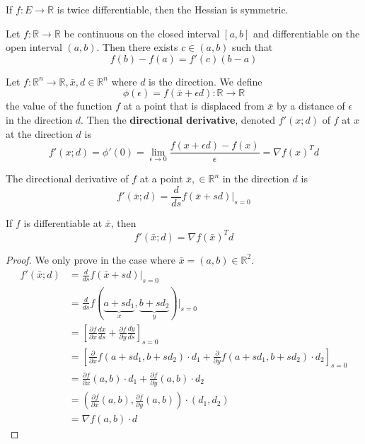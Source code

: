 \begin{theorem}[]
  If $f: E \to \mathbb R$ is twice differentiable, then the Hessian is symmetric.
\end{theorem}
\begin{theorem}
  Let $f: \mathbb R \to \mathbb R$ be continuous on the closed interval $[a,b]$ and differentiable on the open interval $(a,b)$. Then there exists $c \in (a,b)$ such that
  $$f(b) - f(a) = f'(c) (b - a)$$
\end{theorem}
\begin{lemma}
  Let $f: \mathbb R^n \rightarrow \mathbb R, \bar x, d \in \mathbb R^n$ where $d$ is the direction. We define
  $$\phi (\epsilon) = f(\bar x + \epsilon d): \mathbb R \rightarrow \mathbb R$$ the value of the function $f$ at a point that is displaced from $\bar x$ by a distance of $\epsilon$ in the direction $d$.
  Then the \textbf{directional derivative}, denoted $f'(x; d)$ of $f$ at $x$ at the direction $d$ is
  $$f'(x; d) = \phi'(0) = \lim_{\epsilon \rightarrow 0} \frac{f(x + \epsilon d) - f(x)}{\epsilon} = \nabla f(x)^T d$$
\end{lemma}
\begin{definition}
  The directional derivative of $f$ at a point $\bar x, \in \mathbb R^n$ in the direction $d$ is $$f'(\bar x; d) = \frac{d}{ds} f(\bar x + sd) \bigg|_{s = 0}$$
\end{definition}
\begin{theorem}[]
  If $f$ is differentiable at $\bar x$, then $$f'(\bar x; d) = \nabla f(\bar x)^T d$$
\end{theorem}
\begin{proof}[Proof]
  We only prove in the case where $\bar x = (a, b) \in \mathbb R^2$.
  \begin{align*}
      f'(\bar x; d) &= \frac{d}{ds} f(\bar x + sd) \bigg|_{s = 0} \\
      &= \frac{d}{ds} f(\underbrace{a + sd_1}_{x}, \underbrace{b + sd_2}_{y}) \bigg|_{s = 0} \\
      &= \left[\frac{\partial f}{\partial x} \frac{dx}{ds} + \frac{\partial f}{\partial y}\frac{dy}{ds}\right]_{s=0} \tag*{Chain rule}\\
      &= \left[\frac{\partial}{\partial x}f(a + sd_1, b + sd_2) \cdot d_1 + \frac{\partial}{\partial y}f(a + sd_1, b + sd_2) \cdot d_2\right]_{s=0} \\
      &= \frac{\partial f}{\partial x} (a,b) \cdot d_1 + \frac{\partial f}{\partial y}(a,b) \cdot d_2 \\
      &= \left(\frac{\partial f}{\partial x}(a,b), \frac{\partial f}{\partial y} (a,b)\right) \cdot (d_1, d_2) \\
      &= \nabla f(a,b) \cdot d
  \end{align*}
\end{proof}
